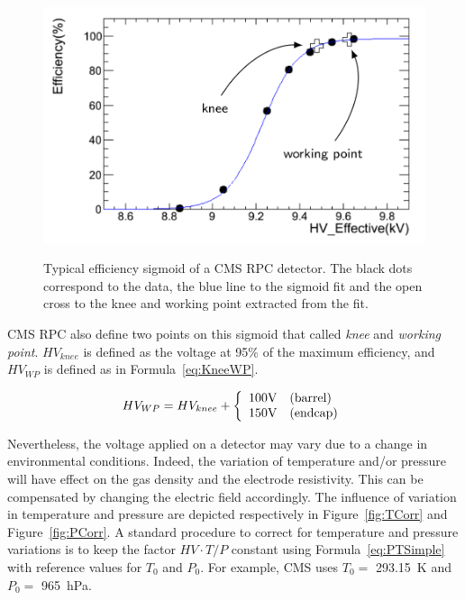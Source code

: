 \endgroup
	
\begingroup\setlength{\intextsep}{10pt}\setlength{\columnsep}{15pt}
	
	\begin{figure}
		\centering
		\includegraphics[width = \linewidth]{fig/chapt3/Eff_sigmoid.png}\\
		\caption{\label{fig:Sigmoid} Typical efficiency sigmoid of a CMS RPC detector. The black dots correspond to the data, the blue line to the sigmoid fit and the open cross to the knee and working point extracted from the fit.}
	\end{figure}
	
	CMS RPC also define two points on this sigmoid that called \textit{knee} and \textit{working point}. $HV_{knee}$ is defined as the voltage at 95\% of the maximum efficiency, and $HV_{WP}$ is defined as in Formula~\ref{eq:KneeWP}.
	
	\begin{equation}
	\label{eq:KneeWP}
	HV_{WP} = HV_{knee} + \left\{\begin{array}{l l}100\mathrm{V} & \mathrm{(barrel)}\\ 150\mathrm{V} & \mathrm{(endcap)}\\ \end{array}\right.
	\end{equation}
	
	Nevertheless, the voltage applied on a detector may vary due to a change in environmental conditions. Indeed, the variation of temperature and/or pressure will have effect on the gas density and the electrode resistivity. This can be compensated by changing the electric field accordingly. The influence of variation in temperature and pressure are depicted respectively in Figure~\ref{fig:TCorr} and Figure~\ref{fig:PCorr}. A standard procedure to correct for temperature and pressure variations is to keep the factor $HV\cdot T/P$ constant using Formula~\ref{eq:PTSimple}~\cite{ABBRESCIA1995,ABBRESCIA1997PRES} with reference values for $T_0$ and $P_0$. For example, CMS uses $T_0=$ \SI{293.15}{K} and $P_0=$ \SI{965}{hPa}.
	

